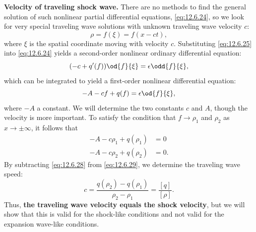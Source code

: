 \textbf{Velocity of traveling shock wave.}  There are no methods to find the general solution of such nonlinear partial differential equations, \eqref{eq:12.6.24}, so we look for very special traveling wave solutions with unknown traveling wave velocity $c$:
\begin{equation}
\label{eq:12.6.25}
\rho = f(\xi) = f(x - ct),
\end{equation}
where $\xi$ is the spatial coordinate moving with velocity $c$.  Substituting \eqref{eq:12.6.25} into \eqref{eq:12.6.24} yields a second-order nonlinear ordinary differential equation:
\begin{equation}
\label{eq:12.6.26}
(-c + q'(f))\od{f}{\xi} = \epsilon\odd{f}{\xi},
\end{equation}
which can be integrated to yield a first-order nonlinear differential equation:
\begin{equation}
\label{eq:12.6.27}
-A - cf + q(f) = \epsilon\od{f}{\xi},
\end{equation}
where $-A$ a constant.  We will determine the two constants $c$ and $A$, though the velocity is more important.  To satisfy the condition that $f \to \rho_1$ and $\rho_2$ as $x \to \pm\infty$, it follows that
\begin{align}
\label{eq:12.6.28}
-A - c\rho_1 + q(\rho_1) &= 0 \\
\label{eq:12.6.29}
-A - c\rho_2 + q(\rho_2) &= 0.
\end{align}
By subtracting \eqref{eq:12.6.28} from \eqref{eq:12.6.29}, we determine the traveling wave speed:
\begin{equation}
\label{eq:12.6.30}
c = \frac{q(\rho_2) - q(\rho_1)}{\rho_2 - \rho_1} = \frac{[q]}{[\rho]}.
\end{equation}
Thus, \textbf{the traveling wave velocity equals the shock velocity}, but we will show that this is valid for the shock-like conditions and not valid for the expansion wave-like conditions.

